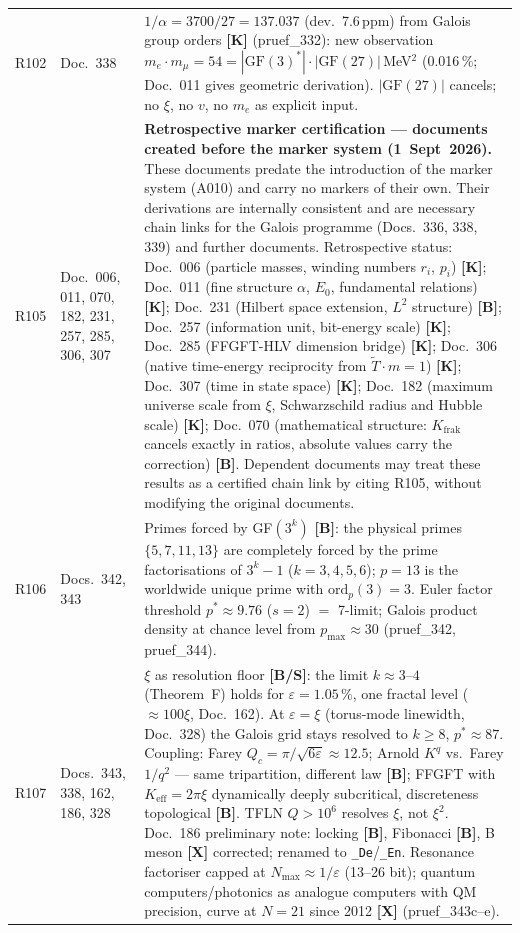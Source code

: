 \begin{longtable}{@{}p{0.9cm}p{3.1cm}p{10.2cm}@{}}
R102 & Doc.~338 & $1/\alpha = 3700/27 = 137.037$ (dev.\ 7.6\,ppm) from Galois group orders \textbf{[K]} (pruef\_332): new observation $m_e\cdot m_\mu = 54 = |\text{GF}(3)^*|\cdot|\text{GF}(27)|$\,MeV$^2$ (0.016\,\%; Doc.~011 gives geometric derivation). $|\text{GF}(27)|$ cancels; no $\xi$, no $v$, no $m_e$ as explicit input. \\
R105 & Doc.~006, 011, 070, 182, 231, 257, 285, 306, 307 & \textbf{Retrospective marker certification — documents created before the marker system (1~Sept~2026).} These documents predate the introduction of the marker system (A010) and carry no markers of their own. Their derivations are internally consistent and are necessary chain links for the Galois programme (Docs.~336, 338, 339) and further documents. Retrospective status: Doc.~006 (particle masses, winding numbers $r_i$, $p_i$) \textbf{[K]}; Doc.~011 (fine structure $\alpha$, $E_0$, fundamental relations) \textbf{[K]}; Doc.~231 (Hilbert space extension, $L^2$ structure) \textbf{[B]}; Doc.~257 (information unit, bit-energy scale) \textbf{[K]}; Doc.~285 (FFGFT-HLV dimension bridge) \textbf{[K]}; Doc.~306 (native time-energy reciprocity from $\tilde{T}\cdot m=1$) \textbf{[K]}; Doc.~307 (time in state space) \textbf{[K]}; Doc.~182 (maximum universe scale from $\xi$, Schwarzschild radius and Hubble scale) \textbf{[K]}; Doc.~070 (mathematical structure: $K_\text{frak}$ cancels exactly in ratios, absolute values carry the correction) \textbf{[B]}. Dependent documents may treat these results as a certified chain link by citing R105, without modifying the original documents. \\
R106 & Docs.~342, 343 & Primes forced by GF$(3^k)$ \textbf{[B]}: the physical primes $\{5,7,11,13\}$ are completely forced by the prime factorisations of $3^k-1$ ($k=3,4,5,6$); $p=13$ is the worldwide unique prime with $\text{ord}_p(3)=3$. Euler factor threshold $p^*\approx9.76$ ($s=2$) $=$ 7-limit; Galois product density at chance level from $p_\text{max}\approx30$ (pruef\_342, pruef\_344). \\
R107 & Docs.~343, 338, 162, 186, 328 & $\xi$ as resolution floor \textbf{[B/S]}: the limit $k\approx3$--$4$ (Theorem~F) holds for $\varepsilon=1.05\,\%$, one fractal level ($\approx100\xi$, Doc.~162). At $\varepsilon=\xi$ (torus-mode linewidth, Doc.~328) the Galois grid stays resolved to $k\geq8$, $p^*\approx87$. Coupling: Farey $Q_c=\pi/\sqrt{6\varepsilon}\approx12.5$; Arnold $K^q$ vs.\ Farey $1/q^2$ --- same tripartition, different law \textbf{[B]}; FFGFT with $K_\text{eff}=2\pi\xi$ dynamically deeply subcritical, discreteness topological \textbf{[B]}. TFLN $Q>10^6$ resolves $\xi$, not $\xi^2$. Doc.~186 preliminary note: locking \textbf{[B]}, Fibonacci \textbf{[B]}, B meson \textbf{[X]} corrected; renamed to \texttt{\_De}/\texttt{\_En}. Resonance factoriser capped at $N_\text{max}\approx1/\varepsilon$ (13--26 bit); quantum computers/photonics as analogue computers with QM precision, curve at $N=21$ since 2012 \textbf{[X]} (pruef\_343c--e). \\

\end{longtable}
